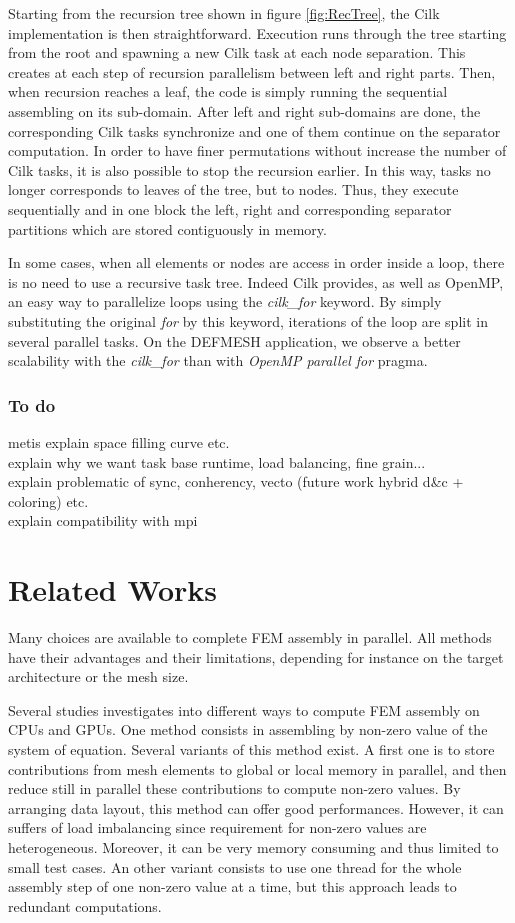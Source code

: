 \documentclass{IOS-Book-Article}
\begin{document}
Starting from the recursion tree shown in figure \ref{fig:RecTree}, the Cilk implementation is then straightforward.
Execution runs through the tree starting from the root and spawning a new Cilk task at each node separation.
This creates at each step of recursion parallelism between left and right parts.
Then, when recursion reaches a leaf, the code is simply running the sequential assembling on its sub-domain.
After left and right sub-domains are done, the corresponding Cilk tasks synchronize and one of them continue on the separator computation.
In order to have finer permutations without increase the number of Cilk tasks, it is also possible to stop the recursion earlier.
In this way, tasks no longer corresponds to leaves of the tree, but to nodes.
Thus, they execute sequentially and in one block the left, right and corresponding separator partitions which are stored contiguously in memory.

In some cases, when all elements or nodes are access in order inside a loop, there is no need to use a recursive task tree.
Indeed Cilk provides, as well as OpenMP, an easy way to parallelize loops using the \emph{cilk\_for} keyword.
By simply substituting the original \emph{for} by this keyword, iterations of the loop are split in several parallel tasks.
On the DEFMESH application, we observe a better scalability with the \emph{cilk\_for} than with \emph{OpenMP parallel for} pragma.

\subsubsection{To do}
metis explain space filling curve etc.\\
explain why we want task base runtime, load balancing, fine grain...\\
explain problematic of sync, conherency, vecto (future work hybrid d\&c + coloring) etc.\\
explain compatibility with mpi\\

\section{Related Works}
Many choices are available to complete FEM assembly in parallel.
All methods have their advantages and their limitations, depending for instance on the target architecture or the mesh size.

Several studies \cite{Stanford,CPUGPUasm} investigates into different ways to compute FEM assembly on CPUs and GPUs.
One method consists in assembling by non-zero value of the system of equation. Several variants of this method exist.
A first one is to store contributions from mesh elements to global or local memory in parallel, and then reduce still in parallel these contributions to compute non-zero values.
By arranging data layout, this method can offer good performances. However, it can suffers of load imbalancing since requirement for non-zero values are heterogeneous.
Moreover, it can be very memory consuming and thus limited to small test cases.
An other variant consists to use one thread for the whole assembly step of one non-zero value at a time, but this approach leads to redundant computations.
\end{document}
